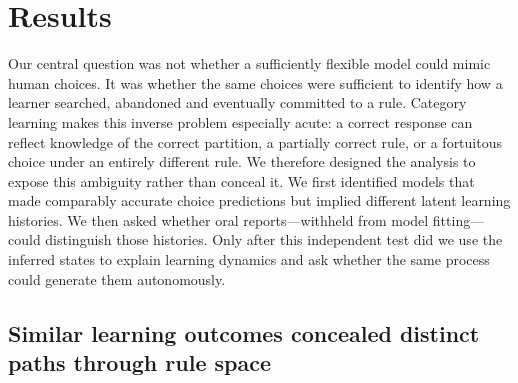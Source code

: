 %
%

\providecommand{\resultpending}[1]{\textcolor{magenta}{[\textit{Result pending: #1}]}}

\section{Results}\label{sec:results}

Our central question was not whether a sufficiently flexible model could mimic
human choices. It was whether the same choices were sufficient to identify how
a learner searched, abandoned and eventually committed to a rule. Category
learning makes this inverse problem especially acute: a correct response can
reflect knowledge of the correct partition, a partially correct rule, or a
fortuitous choice under an entirely different rule. We therefore designed the
analysis to expose this ambiguity rather than conceal it. We first identified
models that made comparably accurate choice predictions but implied different
latent learning histories. We then asked whether oral reports---withheld from
model fitting---could distinguish those histories. Only after this independent
test did we use the inferred states to explain learning dynamics and ask whether
the same process could generate them autonomously.


\subsection{Similar learning outcomes concealed distinct paths through rule space}

